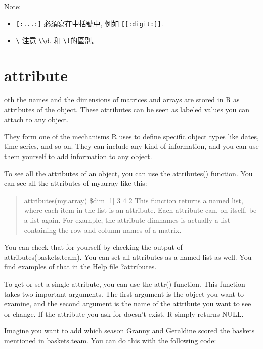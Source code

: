 \documentclass[]{book}
\providecommand{\tightlist}{%
  \setlength{\itemsep}{0pt}\setlength{\parskip}{0pt}}
\theoremstyle{definition}
\theoremstyle{definition}
\theoremstyle{definition}
\theoremstyle{remark}
\begin{document}
Note:

\begin{itemize}
\tightlist
\item
  \texttt{{[}:...:{]}} 必須寫在中括號中, 例如
  \texttt{{[}{[}:digit:{]}{]}}.\\
\item
  \texttt{\textbackslash{}} 注意
  \texttt{\textbackslash{}\textbackslash{}d}. 和
  \texttt{\textbackslash{}t}的區別。
\end{itemize}

\hypertarget{attribute}{%
\section{attribute}\label{attribute}}

oth the names and the dimensions of matrices and arrays are stored in R
as attributes of the object. These attributes can be seen as labeled
values you can attach to any object.

They form one of the mechanisms R uses to define specific object types
like dates, time series, and so on. They can include any kind of
information, and you can use them yourself to add information to any
object.

To see all the attributes of an object, you can use the attributes()
function. You can see all the attributes of my.array like this:

\begin{quote}
attributes(my.array) \$dim {[}1{]} 3 4 2 This function returns a named
list, where each item in the list is an attribute. Each attribute can,
on itself, be a list again. For example, the attribute dimnames is
actually a list containing the row and column names of a matrix.
\end{quote}

You can check that for yourself by checking the output of
attributes(baskets.team). You can set all attributes as a named list as
well. You find examples of that in the Help file ?attributes.

To get or set a single attribute, you can use the attr() function. This
function takes two important arguments. The first argument is the object
you want to examine, and the second argument is the name of the
attribute you want to see or change. If the attribute you ask for
doesn't exist, R simply returns NULL.

Imagine you want to add which season Granny and Geraldine scored the
baskets mentioned in baskets.team. You can do this with the following
code:
\end{document}
